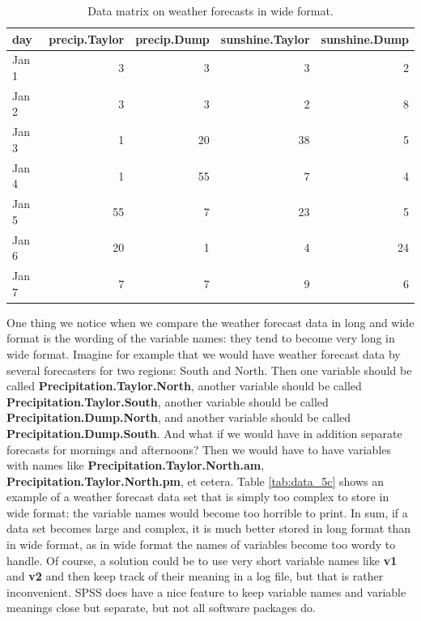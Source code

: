 \documentclass[]{book}\usepackage[]{graphicx}\usepackage[]{color}
\begin{document}
\begin{table}[ht]
\centering
\caption{Data matrix on weather forecasts in wide format.} 
\label{tab:data_5b}
\begin{tabular}{lrrrr}
  \hline
day & precip.Taylor & precip.Dump & sunshine.Taylor & sunshine.Dump \\ 
  \hline
Jan 1 & 3 & 3 & 3 & 2 \\ 
  Jan 2 & 3 & 3 & 2 & 8 \\ 
  Jan 3 & 1 & 20 & 38 & 5 \\ 
  Jan 4 & 1 & 55 & 7 & 4 \\ 
  Jan 5 & 55 & 7 & 23 & 5 \\ 
  Jan 6 & 20 & 1 & 4 & 24 \\ 
  Jan 7 & 7 & 7 & 9 & 6 \\ 
   \hline
\end{tabular}
\end{table}



One thing we notice when we compare the weather forecast data in long and wide format is the wording of the variable names: they tend to become very long in wide format. Imagine for example that we would have weather forecast data by several forecasters for two regions: South and North. Then one variable should be called \textbf{Precipitation.Taylor.North}, another variable should be called \textbf{Precipitation.Taylor.South}, another variable should be called \textbf{Precipitation.Dump.North}, and another variable should be called \textbf{Precipitation.Dump.South}. And what if we would have in addition separate forecasts for mornings and afternoons? Then we would have to have variables with names like \textbf{Precipitation.Taylor.North.am}, \textbf{Precipitation.Taylor.North.pm}, et cetera. Table \ref{tab:data_5c} shows an example of a weather forecast data set that is simply too complex to store in wide format: the variable names would become too horrible to print. In sum, if a data set becomes large and complex, it is much better stored in long format than in wide format, as in wide format the names of variables become too wordy to handle. Of course, a solution could be to use very short variable names like \textbf{v1} and \textbf{v2} and then keep track of their meaning in a log file, but that is rather inconvenient. SPSS does have a nice feature to keep variable names and variable meanings close but separate, but not all software packages do.
\end{document}
